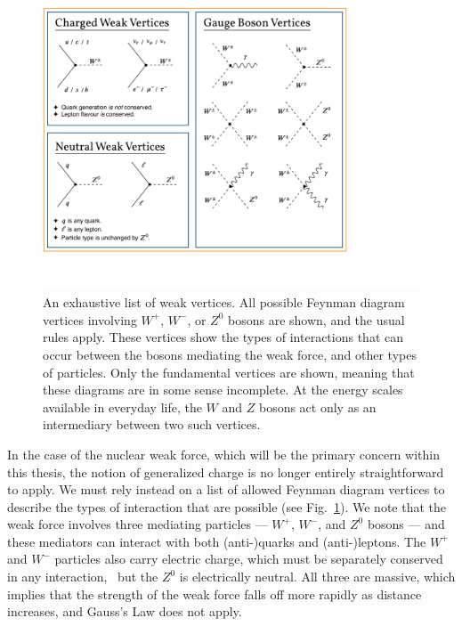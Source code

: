 \begin{figure}[h!t!b!]
	\centering
	\includegraphics[width=1.0\linewidth]{Figures/VertexFeynmanDiagrams.pdf}
	\caption[An exhaustive list of weak vertices]{An exhaustive list of weak vertices.  All possible Feynman diagram vertices involving $W^+$, $W^-$, or $Z^0$ bosons are shown, and the usual rules apply.  These vertices show the types of interactions that can occur between the bosons mediating the weak force, and other types of particles.  Only the fundamental vertices are shown, meaning that these diagrams are in some sense incomplete.  At the energy scales available in everyday life, the $W$ and $Z$ bosons act only as an intermediary between two such vertices.}	
	\label{fig:feynmandiagrams_general}
\end{figure}

In the case of the nuclear weak force, which will be the primary concern within this thesis, 
the notion of generalized charge is no longer entirely straightforward to apply.
We must rely instead on a list of allowed Feynman diagram vertices to describe the types of interaction that are possible (see Fig.~\ref{fig:feynmandiagrams_general}).  We note that the weak force involves three mediating particles --- $W^+$, $W^-$, and $Z^0$ bosons --- and these mediators can interact with both (anti-)quarks and (anti-)leptons.  The $W^+$ and $W^-$ particles also carry electric charge, which must be separately conserved in any interaction,~ but the $Z^0$ is electrically neutral.  All three are massive, which implies that the strength of the weak force falls off more rapidly as distance increases, and Gauss's Law does not apply. 


